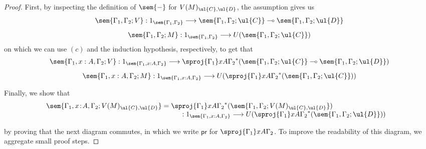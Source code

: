 \begin{proof}
First, by inspecting the definition of $\sem{-}$ for $V(M)_{\ul{C}, \ul{D}}$, the assumption gives us
\[
\begin{array}{c}
\sem{\Gamma_1,\Gamma_2; V} : 1_{\sem{\Gamma_1,\Gamma_2}} \longrightarrow \sem{\Gamma_1,\Gamma_2;\ul{C}} \multimap \sem{\Gamma_1,\Gamma_2;\ul{D}}
\\[3mm]
\sem{\Gamma_1,\Gamma_2; M} : 1_{\sem{\Gamma_1,\Gamma_2}} \longrightarrow U(\sem{\Gamma_1,\Gamma_2;\ul{C}})
\end{array}
\]
on which we can use $(c)$ and the induction hypothesis, respectively, to get that
\[
\begin{array}{c}
\sem{\Gamma_1, x : A,\Gamma_2; V} : 1_{\sem{\Gamma_1, x : A,\Gamma_2}} \longrightarrow \sproj {\Gamma_1} x A {\Gamma_2}^*(\sem{\Gamma_1,\Gamma_2;\ul{C}} \multimap \sem{\Gamma_1,\Gamma_2;\ul{D}})
\\[3mm]
\sem{\Gamma_1, x : A,\Gamma_2; M} : 1_{\sem{\Gamma_1, x : A,\Gamma_2}} \longrightarrow U(\sproj {\Gamma_1} x A {\Gamma_2}^*(\sem{\Gamma_1,\Gamma_2;\ul{C}}))
\end{array}
\]

Finally, we show that 
\[
\begin{array}{c}
\hspace{-3cm}
\sem{\Gamma_1, x \!:\! A,\Gamma_2; V(M)_{\ul{C}, \ul{D}}} = \sproj {\Gamma_1} x A {\Gamma_2}^*(\sem{\Gamma_1,\Gamma_2; V(M)_{\ul{C}, \ul{D}}}) 
\\
\hspace{6.5cm}
: 1_{\sem{\Gamma_1, x : A,\Gamma_2}} \longrightarrow U(\sproj {\Gamma_1} x A {\Gamma_2}^*(\sem{\Gamma_1,\Gamma_2;\ul{D}}))
\end{array}
\]

\pagebreak\noindent
by proving that the next diagram commutes, in which we write $\mathsf{pr}$ for $\sproj {\Gamma_1} x A {\Gamma_2}$. To improve the readability of this diagram, we aggregate small proof steps.


\end{proof}
